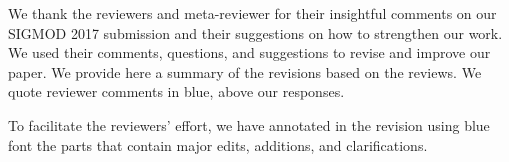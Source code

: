 

\newcommand{\reviewer}[1]{\itshape{{\color{commentColor} #1}}}
\newcommand{\comskip}{\bigskip}


\renewenvironment{quote}
{\vspace{-1mm}\list{}{\rightmargin=0cm \leftmargin=0cm}%
\item\relax}
{\endlist}
 
We thank the reviewers and meta-reviewer for their insightful comments on our
SIGMOD 2017 submission and their suggestions on how to strengthen our work. We
used their comments, questions, and suggestions to revise and improve our
paper. We provide here a summary of the revisions based on the reviews. We
quote reviewer comments in blue, above our responses.

To facilitate the reviewers' effort, we have annotated in the revision using blue font the parts that contain major edits, additions, and clarifications.







